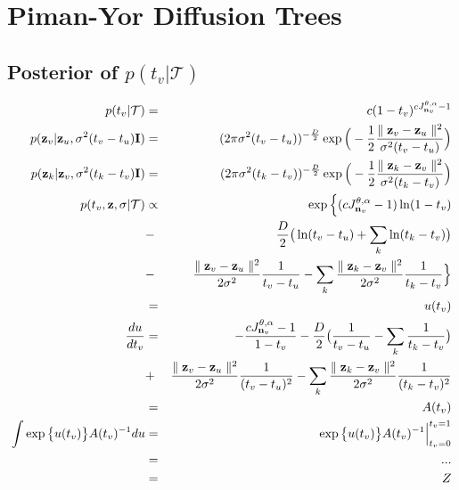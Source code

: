 \documentclass{article}
\begin{document}
\section{Piman-Yor Diffusion Trees}
\subsection{Posterior of $p(t_v | \mathcal{T})$}	
	
	\begin{eqnarray}
	p(t_v | \mathcal{T}) &=& c(1-t_v)^{cJ^{\theta,\alpha}_{\bold{n}_v} - 1} \\
	p(\bold{z}_v | \bold{z}_u, \sigma^2(t_v - t_u)\bold{I}) &=& (2 \pi \sigma^2(t_v - t_u))^{-\frac{D}{2}} \exp \Big(-\frac{1}{2}\frac{\parallel \bold{z}_v - \bold{z}_u \parallel^2}{\sigma^2 (t_v - t_u)} \Big)\\
	p(\bold{z}_k | \bold{z}_v, \sigma^2(t_k - t_v)\bold{I}) &=& (2 \pi \sigma^2(t_k - t_v))^{-\frac{D}{2}} \exp \Big(-\frac{1}{2}\frac{\parallel \bold{z}_k - \bold{z}_v \parallel^2}{\sigma^2 (t_k - t_v)} \Big)\\
	p(t_v, \bold{z}, \sigma | \mathcal{T}) & \propto & \exp \Big\{(cJ^{\theta,\alpha}_{\bold{n}_v} - 1)\ln(1 - t_v) \nonumber \\
	 &-& \frac{D}{2} \big( \ln(t_v - t_u) + \sum_k \ln(t_k - t_v) \big) \nonumber \\
	 &-& \frac{\parallel \bold{z}_v - \bold{z}_u\parallel^2}{2\sigma^2}\frac{1}{t_v - t_u} - \sum_k \frac{\parallel \bold{z}_k - \bold{z}_v\parallel^2}{2\sigma^2}\frac{1}{t_k - t_v} \nonumber \Big\}\\
	 &=& u(t_v)\\
	\frac{du}{dt_v} &=& -\frac{cJ^{\theta,\alpha}_{\bold{n}_v} - 1}{1 - t_v} - \frac{D}{2}\big( \frac{1}{t_v - t_u} - \sum_k\frac{1}{t_k - t_v}\big) \nonumber \\
	 &+& \frac{\parallel \bold{z}_v - \bold{z}_u\parallel^2}{2\sigma^2}\frac{1}{(t_v - t_u)^2} - \sum_k \frac{\parallel \bold{z}_k - \bold{z}_v\parallel^2}{2\sigma^2}\frac{1}{(t_k - t_v)^2} \nonumber \\
	 &=& A(t_v)\\
	 \int \exp \big\{u(t_v)\big\} A(t_v)^{-1}du &=& \exp \big\{u(t_v)\big\} A(t_v)^{-1}\Big\vert^{t_v = 1}_{t_v = 0} \nonumber \\
	 &=& ... \nonumber \\
	 &=& Z
	\end{eqnarray}
	
\end{document}
